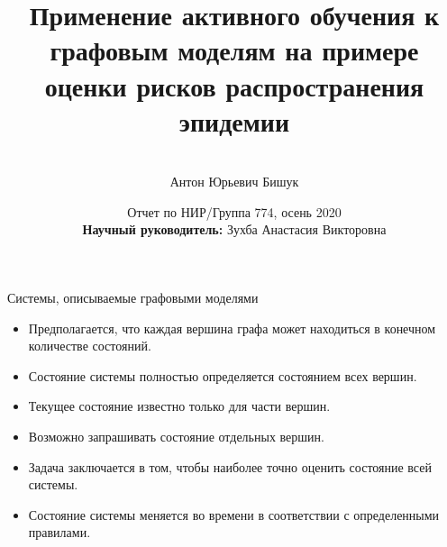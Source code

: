 \documentclass[hyperref={unicode}]{beamer}
\title[\hbox to 56mm{\hfill\insertframenumber\,/\,\inserttotalframenumber}]
{Применение активного обучения к графовым моделям на примере оценки рисков распространения эпидемии}
\author[А.\,Ю. Бишук]{\large \\Антон Юрьевич Бишук}
\institute{\large
Московский физико-технический институт}
\date{\footnotesize{Отчет по НИР/Группа 774, осень 2020\\\textbf{Научный руководитель:} Зухба Анастасия Викторовна}}
\begin{document}
\begin{frame}
\titlepage
\end{frame}
\begin{frame}{Системы, описываемые графовыми моделями}

\begin{itemize}

\item Предполагается, что каждая вершина графа может находиться в конечном количестве состояний. 

\medskip

\item Состояние системы полностью определяется состоянием всех вершин.

\medskip


\item Текущее состояние известно только для части вершин. 


\medskip


\item Возможно запрашивать состояние отдельных вершин.

\medskip

\item Задача заключается в том, чтобы наиболее точно оценить состояние всей системы.

\medskip

\item Состояние системы меняется во времени в соответствии с определенными правилами.


\end{itemize}

 


\end{frame}
\end{document}
